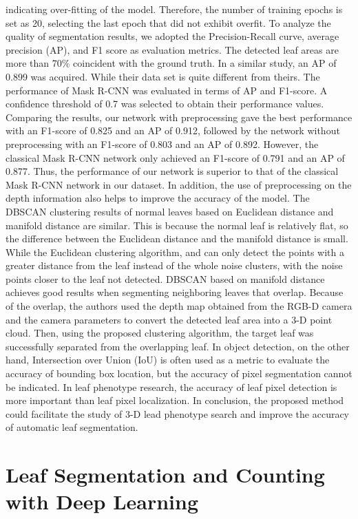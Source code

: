 indicating over-fitting of the model. Therefore, the number of training epochs is set as 20, selecting the last epoch that did not exhibit overfit. To analyze the quality
of segmentation results, we adopted the Precision-Recall curve, average precision (AP), and F1 score as evaluation metrics. The detected leaf areas are more than 70\%
coincident with the ground truth. In a similar study, an AP of 0.899 was acquired. While their data set is quite different from theirs. The performance of Mask R-CNN
was evaluated in terms of AP and F1-score. A confidence threshold of 0.7 was selected to obtain their performance values. Comparing the results, our network with
preprocessing gave the best performance with an F1-score of 0.825 and an AP of 0.912, followed by the network without preprocessing with an F1-score of 0.803 and
an AP of 0.892. However, the classical Mask R-CNN network only achieved an F1-score of 0.791 and an AP of 0.877. Thus, the performance of our network is superior to
that of the classical Mask R-CNN network in our dataset. In addition, the use of preprocessing on the depth information also helps to improve the accuracy of the model.
The DBSCAN clustering results of normal leaves based on Euclidean distance and manifold distance are similar. This is because the normal leaf is relatively flat, so
the difference between the Euclidean distance and the manifold distance is small. While the Euclidean clustering algorithm, and can only detect the points with a greater
distance from the leaf instead of the whole noise clusters, with the noise points closer to the leaf not detected. DBSCAN based on manifold distance achieves good results
when segmenting neighboring leaves that overlap. Because of the overlap, the authors used the depth map obtained from the RGB-D camera and the camera parameters to convert
the detected leaf area into a 3-D point cloud. Then, using the proposed clustering algorithm, the target leaf was successfully separated from the overlapping leaf. In
object detection, on the other hand, Intersection over Union (IoU) is often used as a metric to evaluate the accuracy of bounding box location, but the accuracy of
pixel segmentation cannot be indicated. In leaf phenotype research, the accuracy of leaf pixel detection is more important than leaf pixel localization. In conclusion,
the proposed method could facilitate the study of 3-D lead phenotype search and improve the accuracy of automatic leaf segmentation.

\section{Leaf Segmentation and Counting with Deep Learning}












